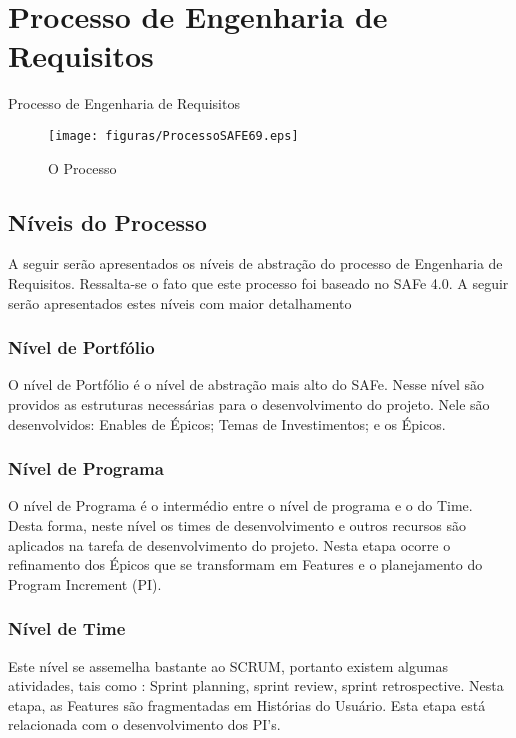 \chapter[Processo de Engenharia de Requisitos]{Processo de Engenharia de Requisitos}
{
	\large{Processo de Engenharia de Requisitos\\}

}


\begin{figure}[h]
    \centering
    \label{fig01}
        \texttt{[image: figuras/ProcessoSAFE69.eps]}
    \caption{O Processo}
\end{figure}


{
	\large{\section {Níveis do Processo} }

	\tab A seguir serão apresentados os níveis de abstração do processo de Engenharia de Requisitos. Ressalta-se o fato que este processo foi baseado no SAFe 4.0. A seguir serão apresentados estes níveis com maior detalhamento\\

}

{
 \large{\subsection {Nível de Portfólio} }
	\tab O nível de Portfólio é o nível de abstração mais alto do SAFe. Nesse nível são providos as estruturas necessárias para o desenvolvimento do projeto.  Nele são desenvolvidos: Enables de Épicos; Temas de Investimentos; e os Épicos. \\

}

{
	 \large{\subsection {Nível de Programa} }

	 \tab O nível de Programa é o intermédio entre o nível de programa e o do Time. Desta forma, neste nível os times de desenvolvimento e outros recursos são aplicados na tarefa de desenvolvimento do projeto.  Nesta etapa ocorre o refinamento dos Épicos que se transformam em Features e o planejamento do Program Increment (PI).\\
}

{
	\large{\subsection {Nível de Time} }

	\tab Este nível se assemelha bastante ao SCRUM,  portanto existem algumas atividades, tais como : Sprint planning, sprint review, sprint retrospective. Nesta etapa, as Features são fragmentadas em Histórias do Usuário. Esta etapa está relacionada com o desenvolvimento dos PI’s. \\
}

